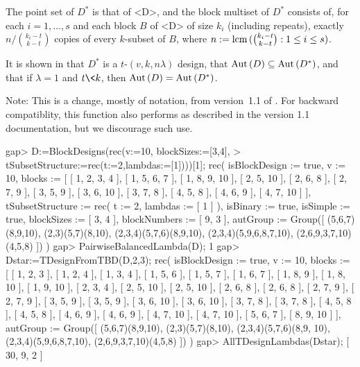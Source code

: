 The point set of $D^{*}$ is that of <D>, and the block multiset of $D^{*}$
consists of, for each $i=1,\ldots,s$ and each block $B$ of <D> of size
$k_i$ (including repeats), exactly $n/{k_i-t \choose k-t}$ copies of
every $k$-subset of $B$, where $n:={\rm lcm}\,({k_i-t \choose k-t}:1\le i\le s)$.

It is shown in \cite{McSo} that $D^{*}$ is a $t$-$(v,k,n\lambda)$ design,
that ${\rm Aut}\,(D)\subseteq{\rm Aut}\,(D^{*})$, and that if $\lambda=1$ and $t\<k$,
then ${\rm Aut}\,(D)={\rm Aut}\,(D^{*})$.

Note: This is a change, mostly of notation, from version~1.1 of
{\DESIGN}. For backward compatiblity, this function also performs as
described in the version 1.1 documentation, but we discourage such use.

\beginexample
gap> D:=BlockDesigns(rec(v:=10, blockSizes:=[3,4],       
>          tSubsetStructure:=rec(t:=2,lambdas:=[1])))[1];
rec( isBlockDesign := true, v := 10, 
  blocks := [ [ 1, 2, 3, 4 ], [ 1, 5, 6, 7 ], [ 1, 8, 9, 10 ], [ 2, 5, 10 ], 
      [ 2, 6, 8 ], [ 2, 7, 9 ], [ 3, 5, 9 ], [ 3, 6, 10 ], [ 3, 7, 8 ], 
      [ 4, 5, 8 ], [ 4, 6, 9 ], [ 4, 7, 10 ] ], 
  tSubsetStructure := rec( t := 2, lambdas := [ 1 ] ), isBinary := true, 
  isSimple := true, blockSizes := [ 3, 4 ], blockNumbers := [ 9, 3 ], 
  autGroup := Group([ (5,6,7)(8,9,10), (2,3)(5,7)(8,10), 
      (2,3,4)(5,7,6)(8,9,10), (2,3,4)(5,9,6,8,7,10), (2,6,9,3,7,10)(4,5,8) ]) 
 )
gap> PairwiseBalancedLambda(D);                          
1
gap> Dstar:=TDesignFromTBD(D,2,3);   
rec( isBlockDesign := true, v := 10, 
  blocks := [ [ 1, 2, 3 ], [ 1, 2, 4 ], [ 1, 3, 4 ], [ 1, 5, 6 ], 
      [ 1, 5, 7 ], [ 1, 6, 7 ], [ 1, 8, 9 ], [ 1, 8, 10 ], [ 1, 9, 10 ], 
      [ 2, 3, 4 ], [ 2, 5, 10 ], [ 2, 5, 10 ], [ 2, 6, 8 ], [ 2, 6, 8 ], 
      [ 2, 7, 9 ], [ 2, 7, 9 ], [ 3, 5, 9 ], [ 3, 5, 9 ], [ 3, 6, 10 ], 
      [ 3, 6, 10 ], [ 3, 7, 8 ], [ 3, 7, 8 ], [ 4, 5, 8 ], [ 4, 5, 8 ], 
      [ 4, 6, 9 ], [ 4, 6, 9 ], [ 4, 7, 10 ], [ 4, 7, 10 ], [ 5, 6, 7 ], 
      [ 8, 9, 10 ] ], 
  autGroup := Group([ (5,6,7)(8,9,10), (2,3)(5,7)(8,10), (2,3,4)(5,7,6)(8,9,
        10), (2,3,4)(5,9,6,8,7,10), (2,6,9,3,7,10)(4,5,8) ]) )
gap> AllTDesignLambdas(Dstar);
[ 30, 9, 2 ]
\endexample
